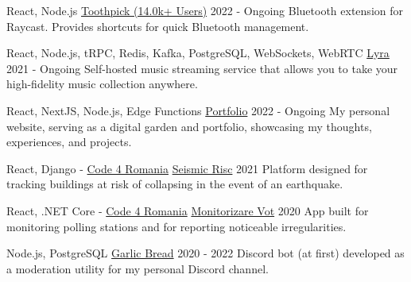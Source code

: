 
\begin{cventries}

  \cventry
  {React, Node.js}
  {\href{https://github.com/VladCuciureanu/Toothpick}{Toothpick (14.0k+ Users)}}
  {}
  {2022 - Ongoing}
  {
    Bluetooth extension for Raycast. Provides shortcuts for quick Bluetooth management.
  }

  \cventry
  {React, Node.js, tRPC, Redis, Kafka, PostgreSQL, WebSockets, WebRTC}
  {\href{https://github.com/VladCuciureanu/Lyra}{Lyra}}
  {}
  {2021 - Ongoing}
  {
    Self-hosted music streaming service that allows you to take your high-fidelity music collection anywhere.
  }

  \cventry
  {React, NextJS, Node.js, Edge Functions}
  {\href{https://vlad.cuciureanu.me}{Portfolio}}
  {}
  {2022 - Ongoing}
  {
    My personal website, serving as a digital garden and portfolio, showcasing my thoughts, experiences, and projects.
  }

  \cventry
  {React, Django - \href{https://code4.ro}{Code 4 Romania}}
  {\href{https://github.com/code4romania/seismic-risc}{Seismic Risc}}
  {}
  {2021}
  {
    Platform designed for tracking buildings at risk of collapsing in the event of an earthquake.
  }

  \cventry
  {React, .NET Core - \href{https://code4.ro}{Code 4 Romania}}
  {\href{https://github.com/code4romania/monitorizare-vot/wiki}{Monitorizare Vot}}
  {}
  {2020}
  {
    App built for monitoring polling stations and for reporting noticeable irregularities.
  }

  \cventry
  {Node.js, PostgreSQL}
  {\href{https://github.com/VladCuciureanu/GarlicBread}{Garlic Bread}}
  {}
  {2020 - 2022}
  {
    Discord bot (at first) developed as a moderation utility for my personal Discord channel.
  }

\end{cventries}
